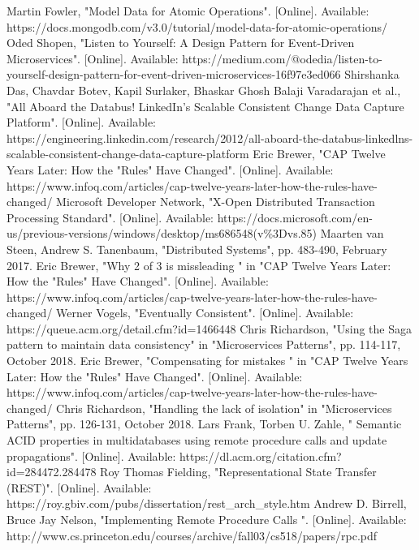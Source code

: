 \documentclass[conference]{IEEEtran}
\begin{document}
\begin{thebibliography}{1}
Martin Fowler, "Model Data for Atomic Operations". [Online]. Available: https://docs.mongodb.com/v3.0/tutorial/model-data-for-atomic-operations/
Oded Shopen, "Listen to Yourself: A Design Pattern for Event-Driven Microservices". [Online]. Available: https://medium.com/@odedia/listen-to-yourself-design-pattern-for-event-driven-microservices-16f97e3ed066
Shirshanka Das, Chavdar Botev, Kapil Surlaker, Bhaskar Ghosh
Balaji Varadarajan et al., "All Aboard the Databus! LinkedIn's Scalable Consistent Change Data Capture Platform". [Online]. Available: https://engineering.linkedin.com/research/2012/all-aboard-the-databus-linkedlns-scalable-consistent-change-data-capture-platform
Eric Brewer, "CAP Twelve Years Later: How the "Rules" Have Changed". [Online]. Available: https://www.infoq.com/articles/cap-twelve-years-later-how-the-rules-have-changed/
Microsoft Developer Network, "X-Open Distributed Transaction Processing Standard". [Online]. Available: https://docs.microsoft.com/en-us/previous-versions/windows/desktop/ms686548(v\%3Dvs.85)
Maarten van Steen, Andrew S. Tanenbaum, "Distributed Systems", pp. 483-490, February 2017.
Eric Brewer, "Why 2 of 3 is missleading
" in "CAP Twelve Years Later: How the "Rules" Have Changed". [Online]. Available: https://www.infoq.com/articles/cap-twelve-years-later-how-the-rules-have-changed/
Werner Vogels, "Eventually Consistent". [Online]. Available: https://queue.acm.org/detail.cfm?id=1466448
Chris Richardson, "Using the Saga pattern to maintain data consistency" in "Microservices Patterns", pp. 114-117, October 2018.
Eric Brewer, "Compensating for mistakes
" in "CAP Twelve Years Later: How the "Rules" Have Changed". [Online]. Available: https://www.infoq.com/articles/cap-twelve-years-later-how-the-rules-have-changed/
Chris Richardson, "Handling the lack of isolation" in "Microservices Patterns", pp. 126-131, October 2018.
Lars Frank, Torben U. Zahle, "
Semantic ACID properties in multidatabases using remote procedure calls and update propagations". [Online]. Available: https://dl.acm.org/citation.cfm?id=284472.284478
Roy Thomas Fielding, "Representational State Transfer (REST)". [Online]. Available: https://roy.gbiv.com/pubs/dissertation/rest\_arch\_style.htm
Andrew D. Birrell, Bruce Jay Nelson, "Implementing Remote Procedure Calls ". [Online]. Available: http://www.cs.princeton.edu/courses/archive/fall03/cs518/papers/rpc.pdf

\end{thebibliography}
\end{document}
